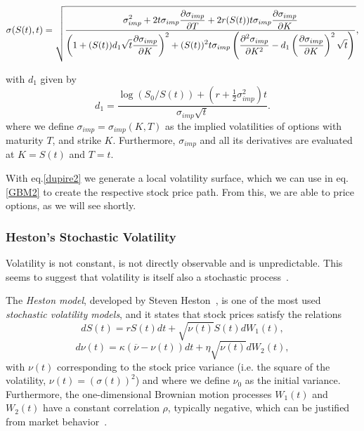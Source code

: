 \begin{strip2}
\vspace{5pt}
\begin{equation}\label{dupire2}
\sigma(S(t),t)=\sqrt{\frac{\displaystyle\sigma_{imp}^2+2t\sigma_{imp}\pdv{\sigma_{imp}}{T}+2r(S(t))t\sigma_{imp}\pdv{\sigma_{imp}}{K}}{\displaystyle\left(1+(S(t))d_1\sqrt{t}\pdv{\sigma_{imp}}{K}\right)^2+(S(t))^2t\sigma_{imp}\left(\pdv{^2\sigma_{imp}}{K^2}-d_1\left(\pdv{\sigma_{imp}}{K}\right)^2\sqrt{t}\right)}},
\end{equation}
\end{strip2}
\noindent with $d_1$ given by
\begin{equation}
d_1=\frac{\log(S_0/S(t))+\left(r+\frac{1}{2}\sigma_{imp}^2\right)t}{\sigma_{imp}\sqrt{t}}.
\end{equation}
\noindent where we define $\sigma_{imp}=\sigma_{imp}(K,T)$ as the implied volatilities of options with maturity $T$, and strike $K$. Furthermore, $\sigma_{imp}$ and all its derivatives are evaluated at $K=S(t)$ and $T=t$.

With eq.\eqref{dupire2} we generate a local volatility surface, which we can use in eq.\eqref{GBM2} to create the respective stock price path. From this, we are able to price options, as we will see shortly.

\vspace{5pt}
\subsubsection{Heston's Stochastic Volatility}
Volatility is not constant, is not directly observable and is unpredictable. This seems to suggest that volatility is itself also a stochastic process~\citep{rebonato}.

The \emph{Heston model}, developed by Steven Heston~\citep{Heston}, is one of the most used \emph{stochastic volatility models}, and it states that stock prices satisfy the relations
\begin{equation}\label{hestons}
dS(t)=rS(t)dt+\sqrt{\nu(t)}S(t)dW_1(t),
\end{equation}
\begin{equation}\label{hestonv}
d\nu(t)=\kappa(\overline{\nu}-\nu(t))dt+\eta\sqrt{\nu(t)}dW_2(t),
\end{equation}\noindent with $\nu(t)$ corresponding to the stock price variance (i.e. the square of the volatility, $\nu(t)=(\sigma(t))^2$) and where we define $\nu_0$ as the initial variance.
Furthermore, the one-dimensional Brownian motion processes $W_1(t)$ and $W_2(t)$ have a constant correlation $\rho$, typically negative, which can be justified from market behavior~\citep{chourdakis}.

